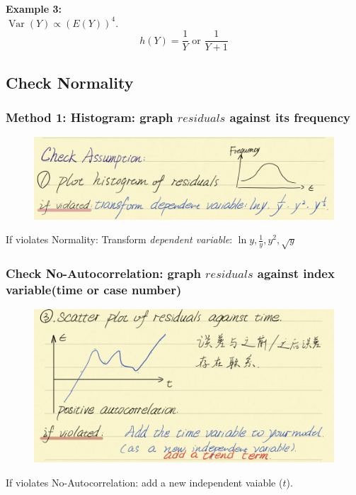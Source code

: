 \documentclass[11pt,a4paper]{article}
\begin{document}
\textbf{Example 3:}\\
$\operatorname{Var}(Y) \propto(E(Y))^{4}$.\\
$$h(Y)=\frac{1}{Y}\text{ or }\frac{1}{Y+1}$$






\subsection{Check Normality}
\subsubsection{Method 1: Histogram: graph $residuals$ against its frequency}
\begin{center}\begin{figure}[htbp]
    \centering
    \includegraphics[scale=0.7]{check2.png}
    \caption{}
    \label{}
\end{figure}\end{center}
If violates Normality: Transform \textit{dependent variable}: $\ln{y}, \frac{1}{y},y^2,\sqrt{y}$
\subsubsection{Check No-Autocorrelation: graph $residuals$ against index variable(time or case number)}
\begin{center}\begin{figure}[htbp]
    \centering
    \includegraphics[scale=0.7]{check3.png}
    \caption{}
    \label{}
\end{figure}\end{center}
If violates No-Autocorrelation: add a new independent vaiable ($t$).
\end{document}
